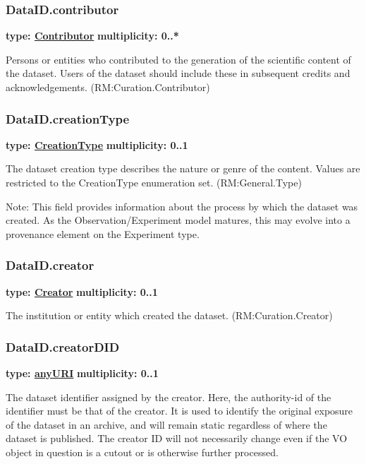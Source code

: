   \subsubsection{DataID.contributor}
  \textbf{type: \hyperref[sect:contributor]{Contributor}} \newline
  \textbf{multiplicity: 0..*} \newline
  
  Persons or entities who contributed to the generation of the scientific
  content of the dataset. Users of the dataset should include these in subsequent
  credits and acknowledgements. (RM:Curation.Contributor)
  
  \subsubsection{DataID.creationType}
  \textbf{type: \hyperref[sect:creation]{CreationType}} \newline
  \textbf{multiplicity: 0..1} \newline
  
  The dataset creation type describes the nature or genre of the content. Values
  are restricted to the CreationType enumeration set. (RM:General.Type)
  
  Note: This field provides information about the process by which the dataset
  was created. As the Observation/Experiment model matures, this may evolve
  into a provenance element on the Experiment type.
  
  \subsubsection{DataID.creator}
  \textbf{type: \hyperref[sect:creator]{Creator}} \newline
  \textbf{multiplicity: 0..1} \newline
  
  The institution or entity which created the dataset. (RM:Curation.Creator)
  
  \subsubsection{DataID.creatorDID}
  \textbf{type: \hyperref[sect:ivoa]{anyURI}} \newline
  \textbf{multiplicity: 0..1} \newline
  
  The dataset identifier assigned by the creator. Here, the authority-id of the
  identifier must be that of the creator. It is used to identify the original
  exposure of the dataset in an archive, and will remain static regardless of
  where the dataset is published. The creator ID will not necessarily change
  even if the VO object in question is a cutout or is otherwise further processed.
  
